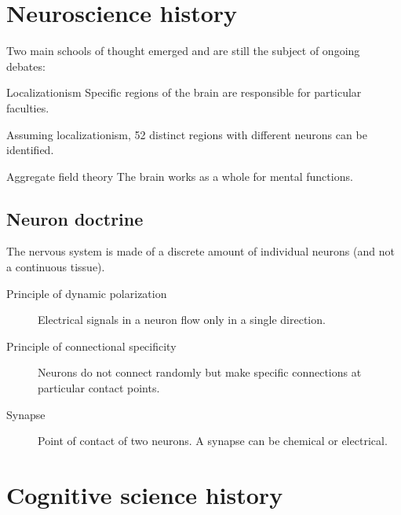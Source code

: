 \section{Neuroscience history}

Two main schools of thought emerged and are still the subject of ongoing debates:
\begin{descriptionlist}
    \item[Localizationism] 
        Specific regions of the brain are responsible for particular faculties.

        Assuming localizationism, 52 distinct regions with different neurons can be identified.

    \item[Aggregate field theory] 
        The brain works as a whole for mental functions.
\end{descriptionlist}


\subsection{Neuron doctrine}
The nervous system is made of a discrete amount of individual neurons (and not a continuous tissue).

\begin{description}
    \item[Principle of dynamic polarization] 
        Electrical signals in a neuron flow only in a single direction.

    \item[Principle of connectional specificity] 
        Neurons do not connect randomly but make specific connections at particular contact points.

    \item[Synapse] 
        Point of contact of two neurons. A synapse can be chemical or electrical.
\end{description}



\section{Cognitive science history}

